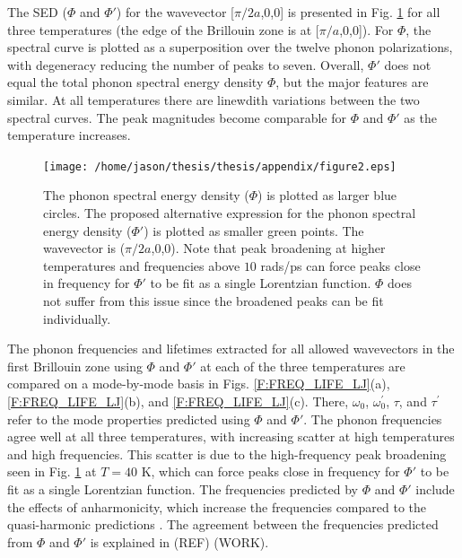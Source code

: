 The SED ($\Phi$ and $\Phi'$) for the wavevector [$\pi/2a$,0,0] is presented 
in Fig$.$ 
\ref{F:PEAK_COMPARE} for all three temperatures (the edge of the Brillouin 
zone is at 
[$\pi/a$,0,0]).  For $\Phi$, the spectral curve is plotted as a 
superposition over the 
twelve phonon polarizations, with degeneracy reducing the number of peaks 
to seven.  Overall, 
$\Phi'$ does not equal the total phonon spectral energy density $\Phi$, 
but the major features 
are similar. At all temperatures there are linewdith variations between 
the two spectral curves. 
The peak magnitudes become comparable for $\Phi$ and $\Phi'$ as the 
temperature increases.
\begin{figure}
\begin{center}
\texttt{[image: /home/jason/thesis/thesis/appendix/figure2.eps]}
\vspace*{0mm}
\end{center}
\caption{\label{F:PEAK_COMPARE} The phonon spectral energy density 
($\Phi$) is plotted as 
larger blue circles.  The proposed alternative expression for the phonon 
spectral energy 
density ($\Phi'$) is plotted as smaller green points. The wavevector is 
($\pi/2a$,0,0). Note 
that peak broadening at higher temperatures and frequencies above $10$ 
rads/ps can force peaks 
close in frequency for $\Phi'$ to be fit as a single Lorentzian function. 
$\Phi$ does not suffer 
from this issue since the broadened peaks can be fit individually.}
\end{figure}
The phonon frequencies and lifetimes extracted for all allowed wavevectors 
in the first Brillouin 
zone using $\Phi$ and $\Phi'$ at each of the three temperatures are 
compared on a mode-by-mode 
basis in Figs$.$ \ref{F:FREQ_LIFE_LJ}(a), \ref{F:FREQ_LIFE_LJ}(b), and 
\ref{F:FREQ_LIFE_LJ}(c). 
There, $\omega_0$, $\omega_0^{'}$, $\tau$, and $\tau^{'}$  refer to the 
mode properties predicted 
using $\Phi$ and $\Phi'$. The phonon frequencies agree well at all three 
temperatures, with 
increasing scatter at high temperatures and high frequencies.  This scatter 
is due to the high-frequency 
peak broadening seen in Fig$.$ \ref{F:PEAK_COMPARE} at $T = 40$ K, which 
can force peaks close in 
frequency for $\Phi'$ to be fit as a single Lorentzian function. The 
frequencies predicted by $\Phi$ 
and $\Phi'$ include the effects of anharmonicity, which increase the 
frequencies compared to the quasi-harmonic predictions 
\cite{mcgaughey_phonon_2006,turney_predicting_2009}. The agreement 
between the frequencies 
predicted from $\Phi$ and $\Phi'$ is explained in 
(REF) (WORK).

